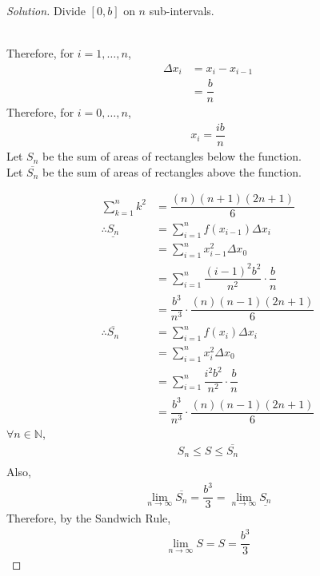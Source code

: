 \documentclass[fleqn, a4paper, 12pt]{article}
\theoremstyle{definition}
\theoremstyle{theorem}
\theoremstyle{remark}
\newenvironment{solution}
{\begin{proof}[Solution]\let\qed\relax}
	{\end{proof}}
\begin{document}
\begin{solution}
	Divide $[0, b]$ on $n$ sub-intervals.\\
	\\
	Therefore, for $i = 1, \dots, n$,
	\begin{align*}
		\Delta x_i &= x _i - x_{i - 1} \\
		&= \dfrac{b}{n}
	\end{align*}
	Therefore, for $i = 0, \dots, n$,
	\begin{align*}
		x_i = \dfrac{i b}{n}
	\end{align*}
	Let $S_n$ be the sum of areas of rectangles below the function.\\
	Let $\overline{S_n}$ be the sum of areas of rectangles above the function.
	
	\begin{align*}
		\sum_{k = 1}^{n} k^2 &= \dfrac{(n)(n + 1)(2n + 1)}{6}\\
		\therefore \underline{S_n} &= \sum_{i = 1}^{n} f(x_{i - 1}) \Delta x_i\\
		&= \sum_{i = 1}^{n} x_{i - 1}^2 \Delta x_0\\
		&= \sum_{i = 1}^{n} \dfrac{(i - 1)^2 b^2}{n^2} \cdot \dfrac{b}{n}\\
		&= \dfrac{b^3}{n^3} \cdot \dfrac{(n)(n - 1)(2n + 1)}{6}\\
		\therefore \overline{S_n} &= \sum_{i = 1}^{n} f(x_i) \Delta x_i\\
		&= \sum_{i = 1}^{n} x_i^2 \Delta x_0\\
		&= \sum_{i = 1}^{n} \dfrac{i^2 b^2}{n^2} \cdot \dfrac{b}{n}\\
		&= \dfrac{b^3}{n^3} \cdot \dfrac{(n)(n - 1)(2n + 1)}{6}
	\end{align*}
	$\forall n \in \mathbb{N}$,
	\begin{align*}
		S_n \leq S \leq \overline{S_n}\\
	\end{align*}
	Also,
	\begin{align*}
		\lim\limits_{n \to \infty} \overline{S_n} = \dfrac{b^3}{3} = \lim\limits_{n \to \infty} \underline{S_n}
	\end{align*}
	Therefore, by the Sandwich Rule,
	\begin{align*}
		\lim\limits_{n \to \infty} S = S = \dfrac{b^3}{3}
	\end{align*}
\end{solution}
\end{document}
